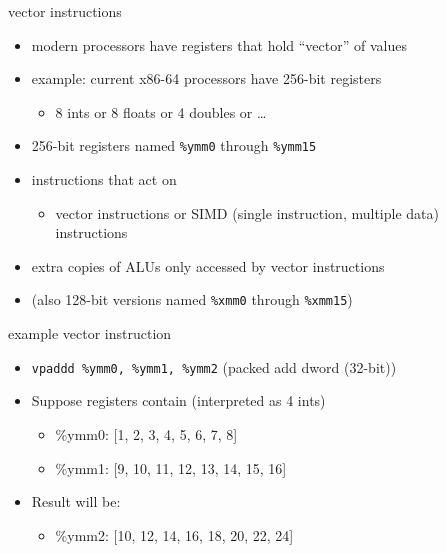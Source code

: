 \begin{frame}[fragile,label=vecInst1]{vector instructions}
    \begin{itemize}
    \item modern processors have registers that hold ``vector'' of values
    \item example: current x86-64 processors have 256-bit registers
        \begin{itemize}
        \item 8 ints or 8 floats or 4 doubles or \ldots
        \end{itemize}
    \item 256-bit registers named \lstinline|%ymm0| through \lstinline|%ymm15|
    \item instructions that act on 
        \begin{itemize}
        \item vector instructions or SIMD (single instruction, multiple data) instructions
        \end{itemize}
    \item extra copies of ALUs only accessed by vector instructions
    \item (also 128-bit versions named \lstinline|%xmm0| through \lstinline|%xmm15|)
    \end{itemize}
\end{frame}

\begin{frame}[fragile,label=vecInstEx]{example vector instruction}
    \begin{itemize}
\item \lstinline|vpaddd %ymm0, %ymm1, %ymm2| {\small (packed add dword (32-bit))}
\item Suppose registers contain (interpreted as 4 ints)
    \begin{itemize}
        \item \%ymm0: [1, 2, 3, 4, 5, 6, 7, 8]
        \item \%ymm1: [9, 10, 11, 12, 13, 14, 15, 16]
    \end{itemize}
\item Result will be:
    \begin{itemize}
        \item \%ymm2: [10, 12, 14, 16, 18, 20, 22, 24]
    \end{itemize}
\end{itemize}
\end{frame}

